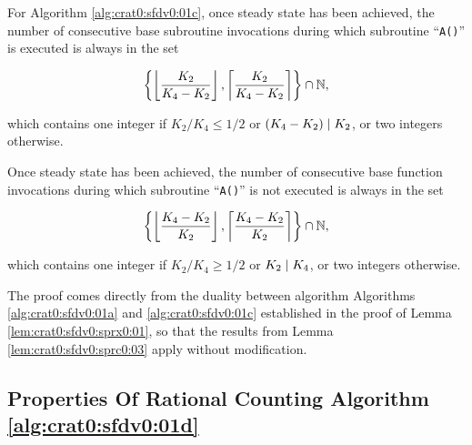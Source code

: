 \begin{vworklemmastatement}
\label{lem:crat0:sfdv0:sprx0:04}
For Algorithm \ref{alg:crat0:sfdv0:01c}, once steady
state has been achieved, the number of consecutive
base subroutine invocations during which subroutine
``\texttt{A()}'' is executed is always in the set

\begin{equation}
\label{eq:lem:crat0:sfdv0:sprx0:04:01}
\left\{
\left\lfloor \frac{K_2}{K_4 - K_2} \right\rfloor ,
\left\lceil  \frac{K_2}{K_4 - K_2} \right\rceil
\right\} \cap {\mathbb{N}},
\end{equation}

which contains one integer if $K_2/K_4 \leq 1/2$ or $(K_4-K_2) \mid K_2$, 
or two integers otherwise.

Once steady state has been achieved, the number of
consecutive base function invocations during which
subroutine ``\texttt{A()}'' is not executed is
always in the set

\begin{equation}
\label{eq:lem:crat0:sfdv0:sprx0:04:02}
\left\{
\left\lfloor \frac{K_4-K_2}{K_2} \right\rfloor ,
\left\lceil  \frac{K_4-K_2}{K_2} \right\rceil
\right\} \cap {\mathbb{N}},
\end{equation}

which contains one integer if $K_2/K_4 \geq 1/2$ or $K_2 \mid K_4$,
or two integers otherwise.
\end{vworklemmastatement}
\begin{vworklemmaproof}
The proof comes directly from the duality between algorithm
Algorithms \ref{alg:crat0:sfdv0:01a} 
and \ref{alg:crat0:sfdv0:01c} established in the
proof of Lemma \ref{lem:crat0:sfdv0:sprx0:01}, so that the results
from Lemma \ref{lem:crat0:sfdv0:sprc0:03} apply without modification.
\end{vworklemmaproof}
\vworklemmafooter{}


\subsection[Properties Of Algorithm \ref{alg:crat0:sfdv0:01d}]
           {Properties Of Rational Counting Algorithm \ref{alg:crat0:sfdv0:01d}}
\label{crat0:sfdv0:sprx1}

